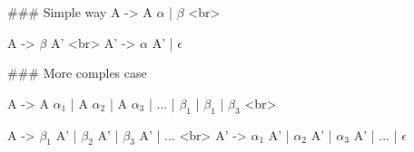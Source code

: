 \documentclass{article}
\begin{document}
### Simple way
A -> A $\alpha$ | $\beta$ <br> 

A -> $\beta$ A' <br>
A' -> $\alpha$ A' | $\epsilon$

### More comples case

A -> A $\alpha_1$ | A $\alpha_2$ | A $\alpha_3$ | ... | $\beta_1$ | $\beta_1$ | $\beta_3$ <br> 

A -> $\beta_1$ A' | $\beta_2$ A' | $\beta_3$ A' | ... <br>
A' -> $\alpha_1$ A' | $\alpha_2$ A' | $\alpha_3$ A' | ... | $\epsilon$
\end{document}

